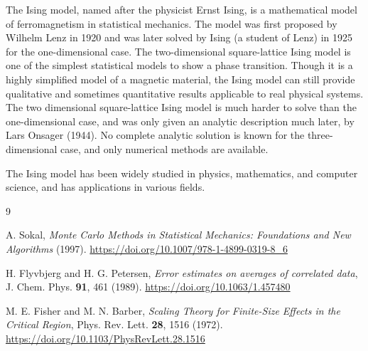 \documentclass[12pt,a4paper]{report}
\begin{document}
The Ising model, named after the physicist Ernst Ising, is a mathematical model of ferromagnetism in statistical mechanics. The model was first proposed by Wilhelm Lenz in 1920 and was later solved by Ising (a student of Lenz) in 1925 for the one-dimensional case. The two-dimensional square-lattice Ising model is one of the simplest statistical models to show a phase transition. Though it is a highly simplified model of a magnetic material, the Ising model can still provide qualitative and sometimes quantitative results applicable to real physical systems. The two dimensional square-lattice Ising model is much harder to solve than the one-dimensional case, and was only given an analytic description much later, by Lars Onsager (1944). No complete analytic solution is known for the three-dimensional case, and only numerical methods are available.

The Ising model has been widely studied in physics, mathematics, and computer science, and has applications in various fields.











\begin{thebibliography}{9}

   A. Sokal, \textit{Monte Carlo Methods in Statistical Mechanics: Foundations and New Algorithms} (1997). \url{https://doi.org/10.1007/978-1-4899-0319-8_6}

   H. Flyvbjerg and H. G. Petersen,  \textit{Error estimates on averages of correlated data}, J. Chem. Phys. \textbf{91}, 461 (1989). \url{https://doi.org/10.1063/1.457480}

  

   M. E. Fisher and M. N. Barber, \textit{Scaling Theory for Finite-Size Effects in the Critical Region}, Phys. Rev. Lett. \textbf{28}, 1516 (1972). \url{https://doi.org/10.1103/PhysRevLett.28.1516}

\end{thebibliography}
\end{document}
